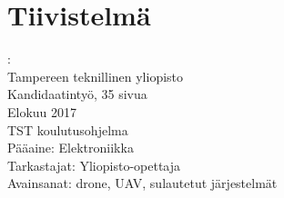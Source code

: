 \documentclass[12pt,a4paper,finnish]{tutthesis}
\begin{document}
\chapter*{Tiivistelmä} %

\begin{spacing}{1.0}
         {\bf \textsf{\MakeUppercase{\@author}}}: \@title\\  %
         \textsf{Tampereen teknillinen yliopisto}\\
         \textsf{Kandidaatintyö, 35 sivua}\\ %
         \textsf{Elokuu 2017}\\
         \textsf{TST koulutusohjelma}\\
         \textsf{Pääaine: Elektroniikka}\\
         \textsf{Tarkastajat:  Yliopisto-opettaja \@examiner}\\ %
         \textsf{Avainsanat: drone, UAV, sulautetut järjestelmät}\\
\end{spacing}









\end{document}
